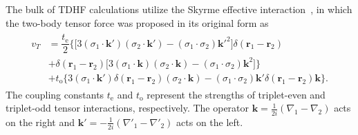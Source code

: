 The bulk of TDHF calculations utilize the Skyrme effective interaction~\citep{skyrme1956}, in which the two-body tensor force was proposed in its original form as
\begin{align}
\begin{split}
v_T&=\dfrac{t_\mathrm{e}}{2}\bigg\{\big[3({\sigma}_\mathrm{1}\cdot\mathbf{k}')({\sigma}_\mathrm{2}\cdot\mathbf{k}')-({\sigma}_\mathrm{1}\cdot{\sigma}_\mathrm{2})\mathbf{k}'^{\mathrm{2}}\big]\delta(\mathbf{r}_\mathrm{1}-\mathbf{r}_\mathrm{2})\\
&+\delta(\mathbf{r}_\mathrm{1}-\mathbf{r}_\mathrm{2})\big[3({\sigma}_\mathrm{1}\cdot\mathbf{k})({\sigma}_\mathrm{2}\cdot\mathbf{k})-({\sigma}_\mathrm{1}\cdot{\sigma}_\mathrm{2})\mathbf{k}^\mathrm{2}\big]\bigg\}\\
&+t_\mathrm{o}\bigg\{3({\sigma}_\mathrm{1}\cdot\mathbf{k}')\delta(\mathbf{r}_\mathrm{1}-\mathbf{r}_\mathrm{2})({\sigma}_\mathrm{2}\cdot\mathbf{k})-({\sigma}_\mathrm{1}\cdot{\sigma}_\mathrm{2})\mathbf{k}'
\delta(\mathbf{r}_\mathrm{1}-\mathbf{r}_\mathrm{2})\mathbf{k}\bigg\}.
\end{split}
\end{align}
The coupling constants $t_\textrm{e}$ and $t_\textrm{o}$ represent the strengths of triplet-even and
triplet-odd tensor interactions, respectively.  The operator $\mathbf{k}=\frac{1}{2i}(\nabla_1-\nabla_2)$ acts on the right and
$\mathbf{k}'=-\frac{1}{2i}(\nabla'_1-\nabla'_2)$ acts on the left.

